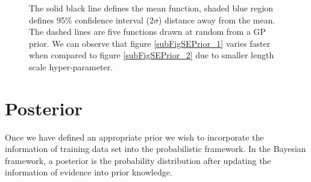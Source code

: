 \begin{figure}[!ht]
  \centering
    \quad
{}\quad
  
       \caption{The solid black line defines the mean function, shaded blue region defines 95\% confidence interval (2$\sigma$) distance away from the mean. The dashed lines are five functions drawn at random from a GP prior. We can observe that figure \ref{subFigSEPrior_1} varies faster when compared to figure \ref{subFigSEPrior_2} due to smaller length scale hyper-parameter.       }\label{figGPPriors}
\end{figure}



\section{Posterior}\label{secPosterior}
Once we have defined an appropriate prior we wish to incorporate the information of training data set into the probabilistic framework. In the Bayesian framework, a posterior is the probability distribution after updating the information of evidence into prior knowledge. 


